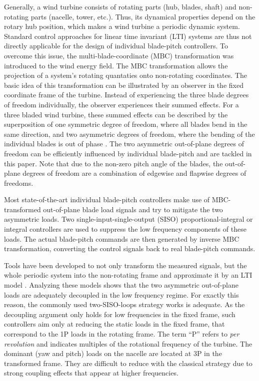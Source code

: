 \documentclass[times]{weauth}
\begin{document}
Generally, a wind turbine consists of rotating parts (hub, blades, shaft) and
non-rotating parts (nacelle, tower, etc.). Thus, its dynamical properties depend
on the rotary hub position, which makes a wind turbine a periodic dynamic
system. Standard control approaches for linear time invariant (LTI) systems are
thus not directly applicable for the design of individual blade-pitch controllers. To
overcome this issue, the multi-blade-coordinate (MBC) transformation was
introduced to the wind energy field. The MBC transformation allows the projection 
of a system's rotating quantaties onto
non-rotating coordinates. The basic idea of this transformation can be
illustrated by an observer in the fixed coordinate frame of the turbine.
Instead of experiencing the three blade degrees of freedom individually, the
observer experiences their summed effects. For a three bladed wind turbine,
these summed effects can be described by the superposition of one symmetric
degree of freedom, where all blades bend in the same direction, and two
asymmetric degrees of freedom, where the bending of the individual blades is out
of phase \cite{bir97}. The two asymmetric out-of-plane degrees of freedom can be
efficiently influenced by individual blade-pitch and are tackled in this paper. Note that
due to the non-zero pitch angle of the blades, the out-of-plane degrees of
freedom are a combination of edgewise and flapwise degrees of freedoms.

Most state-of-the-art individual blade-pitch controllers make use of
MBC-transformed  out-of-plane blade load signals and try to mitigate the two
asymmetric loads. Two single-input-single-output (SISO) proportional-integral
or integral
controllers are used to suppress the low frequency components of these loads.
The actual blade-pitch commands are then generated by inverse MBC
transformation, converting the control signals back to real blade-pitch
commands.

Tools have been developed to not only transform the measured signals, but the
whole periodic system  into the non-rotating frame and approximate it by an
LTI model \cite{Bir08}. Analyzing these models shows that the two
asymmetric out-of-plane loads are adequately decoupled in the low frequency regime.
For exactly this reason, the commonly used two-SISO-loops strategy works is adequate.
As the decoupling argument only holds for low frequencies in the
fixed frame, such controllers aim only at reducing the static loads in the
fixed frame, that correspond to the 1P loads in the rotating frame.
The term ``P'' refers to \textit{per revolution} and indicates multiples of
the rotational frequency of the turbine.
The dominant (yaw and pitch) loads on the nacelle are located at 3P in
the transformed frame. They are difficult to reduce with the classical
strategy due to strong coupling effects that appear at higher frequencies.
\end{document}
